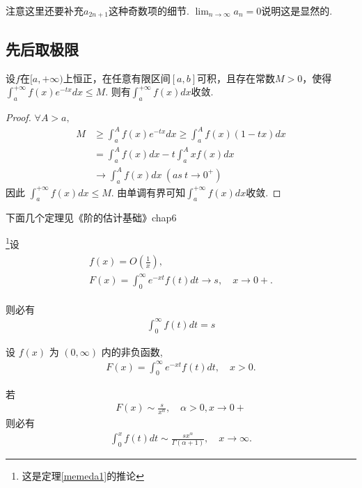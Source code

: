 \begin{note}
    注意这里还要补充$a_{2n+1}$这种奇数项的细节. $\lim_{n\to \infty}a_n=0$说明这是显然的.
\end{note}

\subsection{先后取极限}

\begin{exercise}
设$f$在$[a,+\infty)$上恒正，在任意有限区间$[a,b]$可积，且存在常数$M>0$，使得$\int_{a}^{+\infty}f(x)e^{-tx}dx\le M$. 则有$\int_{a}^{+\infty}f(x)dx$收敛.
\end{exercise}

\begin{proof}
    $\forall A>a,$
    \begin{align*}
        M &\ge \int_{a}^{A}f(x)e^{-tx}dx \ge \int_{a}^{A}f(x)(1-tx)dx\\
        &= \int_{a}^{A}f(x)dx-t\int_{a}^{A}xf(x)dx\\
        &\to \int_{a}^{A}f(x)dx\ (as\ t\to 0^+)
    \end{align*}
    因此 $\int_{a}^{+\infty}f(x)dx\le M$. 由单调有界可知$\int_{a}^{+\infty}f(x)dx$收敛.
\end{proof}

\begin{note}
    下面几个定理见《阶的估计基础》chap6
\end{note}

\begin{theorem}[大O Tauber定理]
    \footnote{这是定理\cref{memeda1}的推论}设
    \begin{align*}
        \begin{gathered}
            f(x)=O\left(\frac{1}{x}\right), \\
            F(x)=\int_0^{\infty} e^{-x t} f(t) d t \rightarrow s, \quad x \rightarrow 0+.
        \end{gathered}
    \end{align*}

    则必有
    \begin{align*}
        \int_0^{\infty} f(t) d t=s
    \end{align*}
\end{theorem}

\begin{theorem}
    设 $f(x)$ 为 $(0, \infty)$ 内的非负函数,
    \begin{align*}
        F(x)=\int_0^{\infty} e^{-x t} f(t) d t, \quad x>0 .
    \end{align*}

    若
    \begin{align*}
        F(x) \sim \frac{s}{x^\alpha}, \quad \alpha>0, x \rightarrow 0+
    \end{align*}
    则必有
    \begin{align*}
        \int_0^x f(t) d t \sim \frac{s x^\alpha}{\Gamma(\alpha+1)}, \quad x \rightarrow \infty .
    \end{align*}
\end{theorem}

